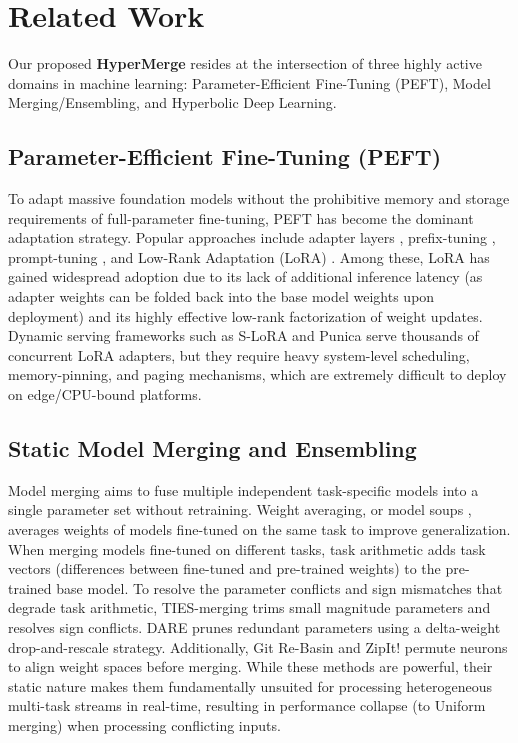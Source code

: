 \section{Related Work}
\label{sec:related_work}

Our proposed \textbf{HyperMerge} resides at the intersection of three highly active domains in machine learning: Parameter-Efficient Fine-Tuning (PEFT), Model Merging/Ensembling, and Hyperbolic Deep Learning.

\subsection{Parameter-Efficient Fine-Tuning (PEFT)}
To adapt massive foundation models without the prohibitive memory and storage requirements of full-parameter fine-tuning, PEFT has become the dominant adaptation strategy. Popular approaches include adapter layers \cite{houlsby2019parameter}, prefix-tuning \cite{li2021prefix}, prompt-tuning \cite{lester2021power}, and Low-Rank Adaptation (LoRA) \cite{hu2021lora}. Among these, LoRA has gained widespread adoption due to its lack of additional inference latency (as adapter weights can be folded back into the base model weights upon deployment) and its highly effective low-rank factorization of weight updates. Dynamic serving frameworks such as S-LoRA \cite{sheng2023slora} and Punica \cite{chen2023punica} serve thousands of concurrent LoRA adapters, but they require heavy system-level scheduling, memory-pinning, and paging mechanisms, which are extremely difficult to deploy on edge/CPU-bound platforms.

\subsection{Static Model Merging and Ensembling}
Model merging aims to fuse multiple independent task-specific models into a single parameter set without retraining. Weight averaging, or model soups \cite{wortsman2022model}, averages weights of models fine-tuned on the same task to improve generalization. When merging models fine-tuned on different tasks, task arithmetic \cite{ilharco2022editing} adds task vectors (differences between fine-tuned and pre-trained weights) to the pre-trained base model. To resolve the parameter conflicts and sign mismatches that degrade task arithmetic, TIES-merging \cite{yadav2023ties} trims small magnitude parameters and resolves sign conflicts. DARE \cite{yu2023dare} prunes redundant parameters using a delta-weight drop-and-rescale strategy. Additionally, Git Re-Basin \cite{ainsworth2022git} and ZipIt! \cite{stoica2023zipit} permute neurons to align weight spaces before merging. While these methods are powerful, their static nature makes them fundamentally unsuited for processing heterogeneous multi-task streams in real-time, resulting in performance collapse (to Uniform merging) when processing conflicting inputs.


